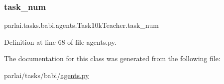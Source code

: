 \subsubsection{\texorpdfstring{task\+\_\+num}{task\_num}}
{\footnotesize\ttfamily parlai.\+tasks.\+babi.\+agents.\+Task10k\+Teacher.\+task\+\_\+num}



Definition at line 68 of file agents.\+py.



The documentation for this class was generated from the following file\+:\begin{DoxyCompactItemize}
\item 
parlai/tasks/babi/\hyperlink{parlai_2tasks_2babi_2agents_8py}{agents.\+py}\end{DoxyCompactItemize}
